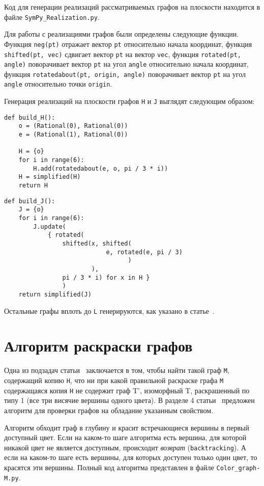 Код для генерации реализаций рассматриваемых графов на плоскости находится в файле {\tt SymPy\_Realization.py}.

Для работы с реализациями графов были определены следующие функции. Функция {\tt neg(pt)} отражает вектор {\tt pt} относительно начала координат, функция {\tt shifted(pt, vec)} сдвигает вектор {\tt pt} на вектор {\tt vec}, функция {\tt rotated(pt, angle)} поворачивает вектор {\tt pt} на угол {\tt angle} относительно начала координат, функция {\tt rotatedabout(pt, origin, angle)} поворачивает вектор {\tt pt} на угол {\tt angle} относительно точки {\tt origin}.

Генерация реализаций на плоскости графов {\tt H} и {\tt J} выглядят следующим образом:

\begin{verbatim}
def build_H():
    o = (Rational(0), Rational(0))
    e = (Rational(1), Rational(0))

    H = {o}
    for i in range(6):
        H.add(rotatedabout(e, o, pi / 3 * i))
    H = simplified(H)
    return H
\end{verbatim}

\begin{verbatim}
def build_J():
    J = {o}
    for i in range(6):
        J.update(
            { rotated(
                shifted(x, shifted(
                            e, rotated(e, pi / 3)
                                  ) 
                        ),
                pi / 3 * i) for x in H }
                )
    return simplified(J)
\end{verbatim}

Остальные графы вплоть до {\tt L} генерируются, как указано в статье~\cite{deGrey}.

\section{Алгоритм раскраски графов}
Одна из подзадач статьи~\cite{deGrey} заключается в том, чтобы найти такой граф {\tt M}, содержащий копию {\tt H}, что ни при какой правильной раскраске графа {\tt M} содержащаяся копия {\tt H} не содержит граф T', изоморфный T, раскрашенный по типу 1 (все три висячие вершины одного цвета).
В разделе 4 статьи~\cite{deGrey} предложен алгоритм для проверки графов на обладание указанным свойством.

Алгоритм обходит граф в глубину и красит встречающиеся вершины в первый доступный цвет. Если на каком-то шаге алгоритма есть вершина, для которой никакой цвет не является доступным, происходит {\it возврат} ({\tt backtracking}). А если на каком-то шаге есть вершины, для которых доступен только один цвет, то красятся эти вершины. Полный код алгоритма представлен в файле {\tt Color\_graph-M.py}.


